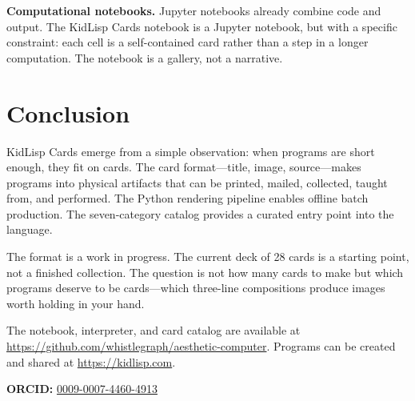 \documentclass[10pt,letterpaper,twocolumn]{article}
\begin{document}
\textbf{Computational notebooks.} Jupyter notebooks already combine code and output. The KidLisp Cards notebook is a Jupyter notebook, but with a specific constraint: each cell is a self-contained card rather than a step in a longer computation. The notebook is a gallery, not a narrative.


\section{Conclusion}

KidLisp Cards emerge from a simple observation: when programs are short enough, they fit on cards. The card format---title, image, source---makes programs into physical artifacts that can be printed, mailed, collected, taught from, and performed. The Python rendering pipeline enables offline batch production. The seven-category catalog provides a curated entry point into the language.

The format is a work in progress. The current deck of 28 cards is a starting point, not a finished collection. The question is not how many cards to make but which programs deserve to be cards---which three-line compositions produce images worth holding in your hand.

The notebook, interpreter, and card catalog are available at \url{https://github.com/whistlegraph/aesthetic-computer}. Programs can be created and shared at \url{https://kidlisp.com}.

\vspace{0.5em}
\noindent\textbf{ORCID:} \href{https://orcid.org/0009-0007-4460-4913}{0009-0007-4460-4913}




\end{document}
